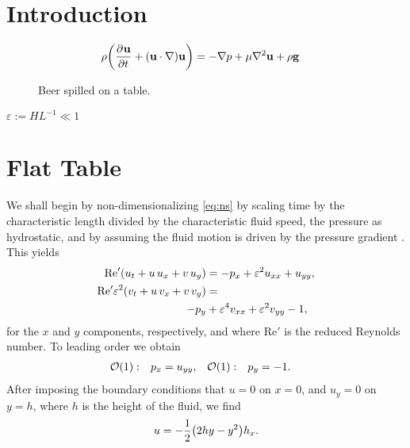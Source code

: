 \documentclass[11pt,a4paper,twocolumn]{article}
\title{}
\author{Brady Metherall}
\date{11 November 2019}
\let\originalleft\left
\let\originalright\right
\renewcommand{\left}{\mathopen{}\mathclose\bgroup\originalleft}
\renewcommand{\right}{\aftergroup\egroup\originalright}
\newcommand{\pdiff}[3][]{\frac{\partial^{#1}#2}{\partial{#3}^{#1}}}
\newcommand{\eps}{\varepsilon}
\providecommand{\bigO}[1]{\ensuremath{\mathop{}\mathopen{}\mathcal{O}\mathopen{}\left(#1\right)}}
\begin{document}
\maketitle

\section{Introduction}

\begin{align}
\rho \left( \pdiff{\mathbf{u}}{t} + \left( \mathbf{u} \cdot \nabla \right) \mathbf{u} \right) &= - \nabla p + \mu \nabla^2 \mathbf{u} + \rho \mathbf{g}
\label{eq:ns}
\end{align}

\begin{figure}[tbp]
\centering
{}
\caption{Beer spilled on a table.}
\label{fig}
\end{figure}

$\eps := H L^{-1} \ll 1$

\section{Flat Table}
We shall begin by non-dimensionalizing \eqref{eq:ns} by scaling time by the characteristic length divided by the characteristic fluid speed, the pressure as hydrostatic, and by assuming the fluid motion is driven by the pressure gradient \cite{howison}. This yields
\begin{align}
\nonumber \text{Re}' \left( u_t + u \, u_x + v \, u_y \right) &= - p_x + \eps^2 u_{xx} + u_{yy}, \\
\text{Re}' \eps^2 \left( v_t + u \, v_x + v \, v_y \right) &= \\
\nonumber - p_y &+ \eps^4 v_{xx} + \eps^2 v_{yy} - 1,
\end{align}
for the $x$ and $y$ components, respectively, and where Re$'$ is the reduced Reynolds number. To leading order we obtain
\begin{align}
\bigO{1}&: & p_x &= u_{yy}, & \bigO{1}&: & p_y &= -1.
\end{align}
After imposing the boundary conditions that $u = 0$ on $x = 0$, and $u_y = 0$ on $y = h$, where $h$ is the height of the fluid, we find
\begin{align}
u = -\frac{1}{2} \left( 2hy - y^2 \right) h_x.
\end{align}
\end{document}
